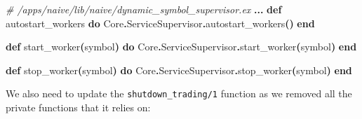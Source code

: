\documentclass[
  oneside]{book}
\newenvironment{Shaded}{\begin{snugshade}}{\end{snugshade}}
\newcommand{\CommentTok}[1]{\textcolor[rgb]{0.56,0.35,0.01}{\textit{#1}}}
\newcommand{\ConstantTok}[1]{\textcolor[rgb]{0.56,0.35,0.01}{#1}}
\newcommand{\FunctionTok}[1]{\textcolor[rgb]{0.13,0.29,0.53}{\textbf{#1}}}
\newcommand{\KeywordTok}[1]{\textcolor[rgb]{0.13,0.29,0.53}{\textbf{#1}}}
\newcommand{\NormalTok}[1]{#1}
\newcommand{\OperatorTok}[1]{\textcolor[rgb]{0.81,0.36,0.00}{\textbf{#1}}}
\begin{document}
\begin{Shaded}
\begin{Highlighting}[]
  \CommentTok{\# /apps/naive/lib/naive/dynamic\_symbol\_supervisor.ex}
  \OperatorTok{...}
  \KeywordTok{def}\NormalTok{ autostart\_workers }\KeywordTok{do}
    \ConstantTok{Core}\OperatorTok{.}\ConstantTok{ServiceSupervisor}\OperatorTok{.}\NormalTok{autostart\_workers}\FunctionTok{()}
  \KeywordTok{end}

  \KeywordTok{def}\NormalTok{ start\_worker}\FunctionTok{(}\NormalTok{symbol}\FunctionTok{)} \KeywordTok{do}
    \ConstantTok{Core}\OperatorTok{.}\ConstantTok{ServiceSupervisor}\OperatorTok{.}\NormalTok{start\_worker}\FunctionTok{(}\NormalTok{symbol}\FunctionTok{)}
  \KeywordTok{end}

  \KeywordTok{def}\NormalTok{ stop\_worker}\FunctionTok{(}\NormalTok{symbol}\FunctionTok{)} \KeywordTok{do}
    \ConstantTok{Core}\OperatorTok{.}\ConstantTok{ServiceSupervisor}\OperatorTok{.}\NormalTok{stop\_worker}\FunctionTok{(}\NormalTok{symbol}\FunctionTok{)}
  \KeywordTok{end}
\end{Highlighting}
\end{Shaded}

We also need to update the \texttt{shutdown\_trading/1} function as we removed all the private functions that it relies on:
\end{document}
